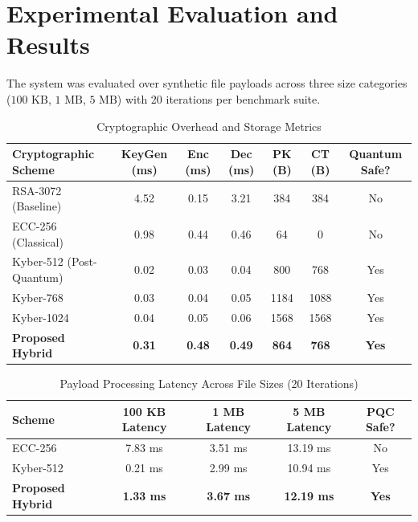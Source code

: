 \documentclass[journal,twoside]{IEEEtran}
\begin{document}
\section{Experimental Evaluation and Results}
The system was evaluated over synthetic file payloads across three size categories ($100\text{ KB}$, $1\text{ MB}$, $5\text{ MB}$) with 20 iterations per benchmark suite.

\begin{table}[htbp]
\caption{Cryptographic Overhead and Storage Metrics}
\label{tab:benchmarks}
\centering
\begin{tabular}{lcccccc}
\toprule
\textbf{Cryptographic Scheme} & \textbf{KeyGen (ms)} & \textbf{Enc (ms)} & \textbf{Dec (ms)} & \textbf{PK (B)} & \textbf{CT (B)} & \textbf{Quantum Safe?} \\
\midrule
RSA-3072 (Baseline) & 4.52 & 0.15 & 3.21 & 384 & 384 & No \\
ECC-256 (Classical) & 0.98 & 0.44 & 0.46 & 64 & 0 & No \\
Kyber-512 (Post-Quantum) & 0.02 & 0.03 & 0.04 & 800 & 768 & Yes \\
Kyber-768 & 0.03 & 0.04 & 0.05 & 1184 & 1088 & Yes \\
Kyber-1024 & 0.04 & 0.05 & 0.06 & 1568 & 1568 & Yes \\
\textbf{Proposed Hybrid} & \textbf{0.31} & \textbf{0.48} & \textbf{0.49} & \textbf{864} & \textbf{768} & \textbf{Yes} \\
\bottomrule
\end{tabular}
\end{table}

\begin{table}[htbp]
\caption{Payload Processing Latency Across File Sizes (20 Iterations)}
\label{tab:sizes}
\centering
\begin{tabular}{lcccc}
\toprule
\textbf{Scheme} & \textbf{100 KB Latency} & \textbf{1 MB Latency} & \textbf{5 MB Latency} & \textbf{PQC Safe?} \\
\midrule
ECC-256 & 7.83 ms & 3.51 ms & 13.19 ms & No \\
Kyber-512 & 0.21 ms & 2.99 ms & 10.94 ms & Yes \\
\textbf{Proposed Hybrid} & \textbf{1.33 ms} & \textbf{3.67 ms} & \textbf{12.19 ms} & \textbf{Yes} \\
\bottomrule
\end{tabular}
\end{table}
\end{document}
